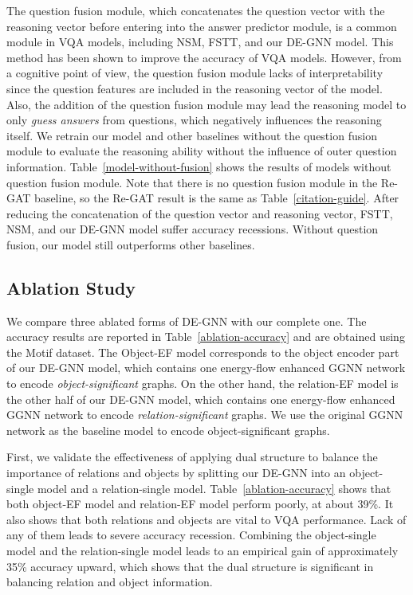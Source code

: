 \documentclass[letterpaper]{article} %
\begin{document}
The question fusion module, which concatenates the question vector with the reasoning vector before entering into the answer predictor module, is a common module in VQA models, including NSM, FSTT, and our DE-GNN model. This method has been shown to improve the accuracy of VQA models. However, from a cognitive point of view, the question fusion module lacks of interpretability since the question features are included in the reasoning vector of the model. 
Also, the addition of the question fusion module may lead the reasoning model to only \emph{guess answers} from questions, which negatively influences the reasoning itself. 
We retrain our model and other baselines without the question fusion module to evaluate the reasoning ability without the influence of outer question information. 
Table~\ref{model-without-fusion} shows the results of models without question fusion module. 
Note that there is no question fusion module in the Re-GAT baseline, so the Re-GAT result is the same as Table~\ref{citation-guide}.
After reducing the concatenation of the question vector and reasoning vector, FSTT, NSM, and our DE-GNN model suffer accuracy recessions. Without question fusion, our model still outperforms other baselines.

\subsection{Ablation Study}

We compare three ablated forms of DE-GNN with our complete one. 
The accuracy results are reported in Table~\ref{ablation-accuracy} and are obtained using the Motif dataset. 
The Object-EF model corresponds to the object encoder part of our DE-GNN model, which contains one energy-flow enhanced GGNN network to encode \emph{object-significant} graphs. 
On the other hand, the relation-EF model is the other half of our DE-GNN model, which contains one energy-flow enhanced GGNN network to encode \emph{relation-significant} graphs. 
We use the original GGNN network as the baseline model to encode object-significant graphs.

First, we validate the effectiveness of applying dual structure to balance the importance of relations and objects by splitting our DE-GNN into an object-single model and a relation-single model. Table~\ref{ablation-accuracy} shows that both object-EF model and relation-EF model perform poorly, at about 39\%. 
It also shows that both relations and objects are vital to VQA performance. Lack of any of them leads to severe accuracy recession. Combining the object-single model and the relation-single model leads to an empirical gain of approximately 35\% accuracy upward, which shows that the dual structure is significant in balancing relation and object information. 
\end{document}

